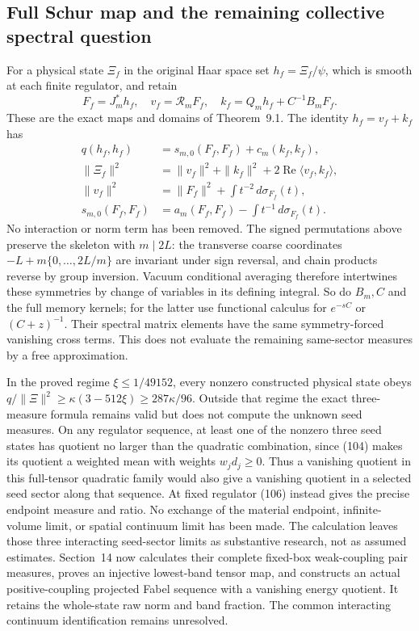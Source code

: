 \documentclass[11pt]{article}
\begin{document}
\subsection{Full Schur map and the remaining collective spectral question}
For a physical state $\Xi_f$ in the original Haar space set
$h_f=\Xi_f/\psi$, which is smooth at each finite regulator, and retain
\[
 F_f=J_m^*h_f,\quad
 v_f=\mathcal R_mF_f,\quad
 k_f=Q_mh_f+C^{-1}B_mF_f.
\]
These are the exact maps and domains of Theorem~9.1.
The identity $h_f=v_f+k_f$ has
\begin{align*}
 q(h_f,h_f)&=s_{m,0}(F_f,F_f)+c_m(k_f,k_f),\\
 \|\Xi_f\|^2&=\|v_f\|^2+\|k_f\|^2
                         +2\operatorname{Re}\langle v_f,k_f\rangle,\\
 \|v_f\|^2&=\|F_f\|^2+\int t^{-2}\,d\sigma_{F_f}(t),\\
 s_{m,0}(F_f,F_f)&=a_m(F_f,F_f)-\int t^{-1}\,d\sigma_{F_f}(t).
\end{align*}
No interaction or norm term has been removed.
The signed permutations above preserve the skeleton with $m\mid2L$:
the transverse coarse coordinates $-L+m\{0,\ldots,2L/m\}$ are invariant
under sign reversal, and chain products reverse by group inversion.
Vacuum conditional averaging therefore intertwines these symmetries by
change of variables in its defining integral. So do $B_m,C$ and the
full memory kernels; for the latter use functional calculus for
$e^{-sC}$ or $(C+z)^{-1}$. Their spectral matrix elements have the same
symmetry-forced vanishing cross terms. This does not evaluate the
remaining same-sector measures by a free approximation.

In the proved regime $\xi\le1/49152$, every nonzero constructed physical
state obeys $q/\|\Xi\|^2\ge\kappa(3-512\xi)\ge287\kappa/96$.
Outside that regime the exact three-measure formula remains valid but
does not compute the unknown seed measures. On any regulator sequence,
at least one of the nonzero three seed states has quotient no larger
than the quadratic combination, since (104)
makes its quotient a weighted mean with weights $w_jd_j\ge0$.
Thus a vanishing quotient in this full-tensor quadratic family would
also give a vanishing quotient in a selected seed sector along that
sequence. At fixed regulator (106)
instead gives the precise endpoint measure and ratio. No exchange of
the material endpoint, infinite-volume limit, or spatial continuum
limit has been made. The calculation leaves those three interacting
seed-sector limits as substantive research, not as assumed estimates.
Section~14 now calculates their complete fixed-box
weak-coupling pair measures, proves an injective lowest-band tensor map,
and constructs an actual positive-coupling projected Fabel sequence with
a vanishing energy quotient. It retains the whole-state raw norm and
band fraction. The common interacting continuum identification remains
unresolved.
\end{document}
